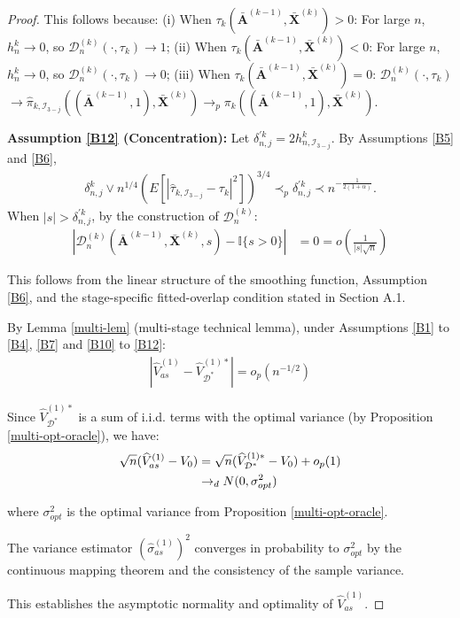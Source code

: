 \documentclass[11pt]{article}
\theoremstyle{referenceplain}
\theoremstyle{referencedefinition}
\theoremstyle{referenceremark}
\begin{document}
\begin{proof}
This follows because:
(i) When $\tau_k(\bar{\mathbf{A}}^{(k-1)},\bar{\mathbf{X}}^{(k)}) > 0$: For large $n$, $h_n^k \to 0$, so {$\mathcal{D}_n^{(k)}(\cdot,\tau_k) \to 1$};
(ii) When $\tau_k(\bar{\mathbf{A}}^{(k-1)},\bar{\mathbf{X}}^{(k)}) < 0$: For large $n$, $h_n^k \to 0$, so {$\mathcal{D}_n^{(k)}(\cdot,\tau_k) \to 0$};  
(iii) When $\tau_k(\bar{\mathbf{A}}^{(k-1)},\bar{\mathbf{X}}^{(k)}) = 0$: {$\mathcal{D}_n^{(k)}(\cdot,\tau_k)$} $\to \widehat{\pi}_{k,\mathcal{I}_{3-j}}((\bar{\mathbf{A}}^{(k-1)},1),\bar{\mathbf{X}}^{(k)}) \to_p \pi_k((\bar{\mathbf{A}}^{(k-1)},1),\bar{\mathbf{X}}^{(k)})$.

\textbf{Assumption \ref{B12} (Concentration):}
Let ${\delta_{n,j}^{\prime k}} = 2h_{n,\mathcal{I}_{3-j}}^k$. {By Assumptions \ref{B5} and \ref{B6},
\begin{align*}
\delta_{n,j}^k\lor n^{1/4}\left(E[|\widehat\tau_{k,\mathcal I_{3-j}}-\tau_k|^2]\right)^{3/4}
\prec_p\delta_{n,j}^{\prime k}\prec n^{-\frac{1}{2(1+\alpha)}}.
\end{align*}}
When $|s| > {\delta_{n,j}^{\prime k}}$, by the construction of {$\mathcal{D}_n^{(k)}$}:
\begin{align*}
    |{\mathcal{D}_n^{(k)}}(\bar{\mathbf{A}}^{(k-1)},\bar{\mathbf{X}}^{(k)},s) - {\mathbb{I}\{s>0\}}| &{=0}= o\left(\frac{1}{|s|\sqrt{n}}\right)
\end{align*}

This follows from the linear structure of the smoothing function{,} Assumption \ref{B6}{,} {and the stage-specific fitted-overlap condition stated in Section A.1}.


By Lemma \ref{multi-lem} (multi-stage technical lemma), under Assumptions \ref{B1} to \ref{B4}, \ref{B7} and \ref{B10} to \ref{B12}:
\begin{align*}
    \left|\widehat{V}_{as}^{(1)} - \widehat{V}_{\mathcal{D}^*}^{(1)*}\right| = o_p(n^{-1/2})
\end{align*}


Since $\widehat{V}_{\mathcal{D}^*}^{(1)*}$ is a sum of i.i.d. terms with the optimal variance (by Proposition \ref{multi-opt-oracle}), we have:
\begin{align*}
    \sqrt{n}(\widehat{V}_{as}^{(1)} - V_0) &= \sqrt{n}(\widehat{V}_{\mathcal{D}^*}^{(1)*} - V_0) + o_p(1)\notag\\
    &\to_d N(0, \sigma_{opt}^2)
\end{align*}

where $\sigma_{opt}^2$ is the optimal variance from Proposition \ref{multi-opt-oracle}.


The variance estimator $(\widehat{\sigma}_{as}^{(1)})^2$ converges in probability to $\sigma_{opt}^2$ by the continuous mapping theorem and the consistency of the sample variance.

This establishes the asymptotic normality and optimality of $\widehat{V}_{as}^{(1)}$.
\end{proof}
\end{document}
